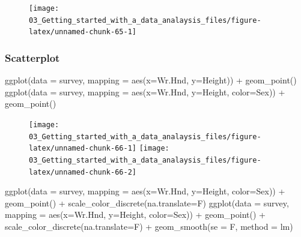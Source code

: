 \documentclass[
]{book}
\newenvironment{Shaded}{\begin{snugshade}}{\end{snugshade}}
\newcommand{\AttributeTok}[1]{\textcolor[rgb]{0.77,0.63,0.00}{#1}}
\newcommand{\FunctionTok}[1]{\textcolor[rgb]{0.00,0.00,0.00}{#1}}
\newcommand{\NormalTok}[1]{#1}
\newcommand{\SpecialCharTok}[1]{\textcolor[rgb]{0.00,0.00,0.00}{#1}}
\begin{document}
\begin{figure}
\texttt{[image: 03\_Getting\_started\_with\_a\_data\_analaysis\_files/figure-latex/unnamed-chunk-65-1]} \end{figure}

\hypertarget{scatterplot-1}{%
\subsubsection{Scatterplot}\label{scatterplot-1}}

\begin{Shaded}
\begin{Highlighting}[]
\FunctionTok{ggplot}\NormalTok{(}\AttributeTok{data =}\NormalTok{ survey, }\AttributeTok{mapping =} \FunctionTok{aes}\NormalTok{(}\AttributeTok{x=}\NormalTok{Wr.Hnd, }\AttributeTok{y=}\NormalTok{Height)) }\SpecialCharTok{+} 
  \FunctionTok{geom\_point}\NormalTok{()}
\FunctionTok{ggplot}\NormalTok{(}\AttributeTok{data =}\NormalTok{ survey, }\AttributeTok{mapping =} \FunctionTok{aes}\NormalTok{(}\AttributeTok{x=}\NormalTok{Wr.Hnd, }\AttributeTok{y=}\NormalTok{Height, }\AttributeTok{color=}\NormalTok{Sex)) }\SpecialCharTok{+} 
  \FunctionTok{geom\_point}\NormalTok{()}
\end{Highlighting}
\end{Shaded}

\begin{figure}
\texttt{[image: 03\_Getting\_started\_with\_a\_data\_analaysis\_files/figure-latex/unnamed-chunk-66-1]} \texttt{[image: 03\_Getting\_started\_with\_a\_data\_analaysis\_files/figure-latex/unnamed-chunk-66-2]} \end{figure}

\begin{Shaded}
\begin{Highlighting}[]
\FunctionTok{ggplot}\NormalTok{(}\AttributeTok{data =}\NormalTok{ survey, }\AttributeTok{mapping =} \FunctionTok{aes}\NormalTok{(}\AttributeTok{x=}\NormalTok{Wr.Hnd, }\AttributeTok{y=}\NormalTok{Height, }\AttributeTok{color=}\NormalTok{Sex)) }\SpecialCharTok{+} 
  \FunctionTok{geom\_point}\NormalTok{() }\SpecialCharTok{+} \FunctionTok{scale\_color\_discrete}\NormalTok{(}\AttributeTok{na.translate=}\NormalTok{F)}
\FunctionTok{ggplot}\NormalTok{(}\AttributeTok{data =}\NormalTok{ survey, }\AttributeTok{mapping =} \FunctionTok{aes}\NormalTok{(}\AttributeTok{x=}\NormalTok{Wr.Hnd, }\AttributeTok{y=}\NormalTok{Height, }\AttributeTok{color=}\NormalTok{Sex)) }\SpecialCharTok{+} 
  \FunctionTok{geom\_point}\NormalTok{() }\SpecialCharTok{+} \FunctionTok{scale\_color\_discrete}\NormalTok{(}\AttributeTok{na.translate=}\NormalTok{F) }\SpecialCharTok{+} 
  \FunctionTok{geom\_smooth}\NormalTok{(}\AttributeTok{se =}\NormalTok{ F, }\AttributeTok{method =}\NormalTok{ lm)}
\end{Highlighting}
\end{Shaded}
\end{document}
